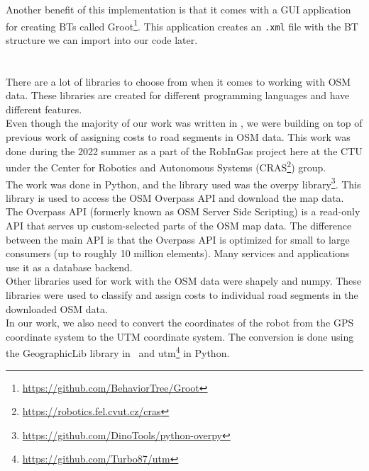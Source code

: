         Another benefit of this implementation is that it comes with a GUI application for creating BTs called Groot\footnote{\url{https://github.com/BehaviorTree/Groot}}. This application creates an \texttt{.xml} file with the BT structure we can import into our code later.\\\\
    \\
        There are a lot of libraries to choose from when it comes to working with OSM data. These libraries are created for different programming languages and have different features.\\
        Even though the majority of our work was written in \CC, we were building on top of previous work of assigning costs to road segments in OSM data. This work was done during the 2022 summer as a part of the RobInGas project here at the CTU under the Center for Robotics and Autonomous Systems (CRAS\footnote{\url{https://robotics.fel.cvut.cz/cras}}) group.\\
        The work was done in Python, and the library used was the overpy library\footnote{\url{https://github.com/DinoTools/python-overpy}}. This library is used to access the OSM Overpass API and download the map data. The Overpass API (formerly known as OSM Server Side Scripting) is a read-only API that serves up custom-selected parts of the OSM map data. The difference between the main API is that the Overpass API is optimized for small to large consumers (up to roughly 10 million elements). Many services and applications use it as a database backend.\cite{Overpass}\\
        Other libraries used for work with the OSM data were shapely\cite{shapely} and numpy\cite{numpy}. These libraries were used to classify and assign costs to individual road segments in the downloaded OSM data.\\
        In our work, we also need to convert the coordinates of the robot from the GPS coordinate system to the UTM coordinate system. The conversion is done using the GeographicLib library\cite{GeographicLib} in \CC\ and utm\footnote{\url{https://github.com/Turbo87/utm}} in Python.